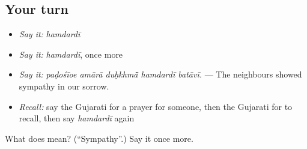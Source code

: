 \subsection*{Your turn}
\begin{itemize}
\raggedright
  \item \emph{Say it:} \emph{hamdardī}
  \item \emph{Say it:} \emph{hamdardī}, once more
  \item \emph{Say it:} \emph{paḍośīoe amārā duḥkhmā̃ hamdardī batāvī.} — The neighbours showed sympathy in our sorrow.
  \item \emph{Recall:} say the Gujarati for a prayer for someone, then the Gujarati for to recall, then say \emph{hamdardī} again
\end{itemize}

\begin{tcolorbox}[breakable,colback=teal!4,colframe=teal!35!black,title={Before you move on}]
What does  mean? (\textquotedblleft{}Sympathy\textquotedblright{}.) Say it once more.
\end{tcolorbox}
